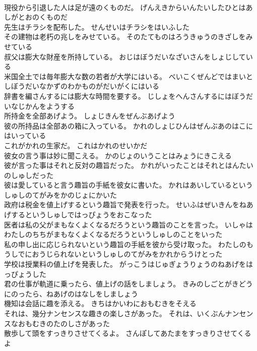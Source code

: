 \documentclass[8pt]{extreport}
\begin{document}
\begin{CJK}{UTF8}{min}
\\	現役から引退した人は足が遠のくものだ。	げんえきからいんたいしたひとはあしがとおのくものだ 
\\	先生はチラシを配布した。	せんせいはチラシをはいふした 
\\	その建物は老朽の兆しをみせている。	そのたてものはろうきゅうのきざしをみせている 
\\	叔父は膨大な財産を所持している。	おじはぼうだいなざいさんをしょじしている 
\\	米国全土では毎年膨大な数の若者が大学にはいる。	べいこくぜんどではまいとしぼうだいなかずのわかものがだいがくにはいる 
\\	辞書を編さんするには膨大な時間を要する。	じしょをへんさんするにはぼうだいなじかんをようする 
\\	所持金を全部あげよう。	しょじきんをぜんぶあげよう 
\\	彼の所持品は全部あの箱に入っている。	かれのしょじひんはぜんぶあのはこにはいっている 
\\	これがかれの生家だ。	これはかれのせいかだ 
\\	彼女の言う事は妙に聞こえる。	かのじょのいうことはみょうにきこえる 
\\	彼が言った事はそれと反対の趣旨だった。	かれがいったことはそれとはんたいのしゅしだった 
\\	彼は愛していると言う趣旨の手紙を彼女に書いた。	かれはあいしているというしゅしのてがみをかのじょにかいた 
\\	政府は税金を値上げするという趣旨で発表を行った。	せいふはぜいきんをねあげするというしゅしではっぴょうをおこなった 
\\	医者は私の父がまもなくよくなるだろうという趣旨のことを言った。	いしゃはわたしのちちがまもなくよくなるだろうというしゅしのことをいった 
\\	私の申し出に応じられないという趣旨の手紙を彼から受け取った。	わたしのもうしでにおうじられないというしゅしのてがみをかれからうけとった 
\\	学校は授業料の値上げを発表した。	がっこうはじゅぎょうりょうのねあげをはっぴょうした 
\\	君の仕事が軌道に乗ったら、値上げの話をしましょう。	きみのしごとがきどうにのったら、ねあげのはなしをしましょう 
\\	機知は会話に趣を添える。	きちはかいわにおもむきをそえる 
\\	それは、幾分ナンセンスな趣きの楽しさがあった。	それは、いくぶんナンセンスなおもむきのたのしさがあった 
\\	散歩して頭をすっきりさせてくるよ。	さんぽしてあたまをすっきりさせてくるよ 

\end{CJK}
\end{document}
